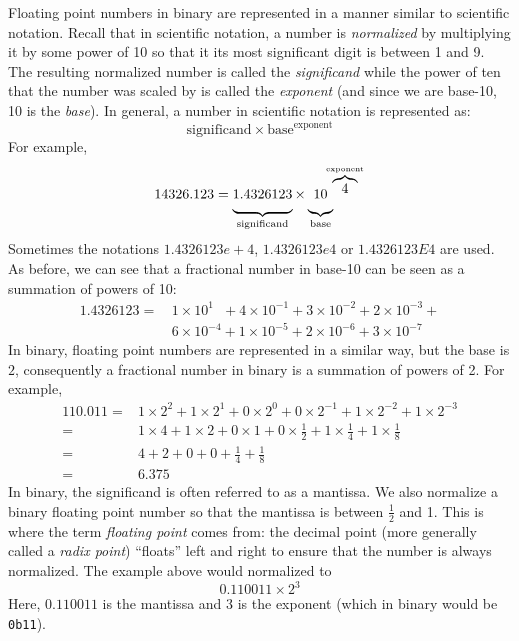Floating point  numbers in binary are 
represented in a manner similar
to scientific notation.  Recall that in scientific notation, a number is \emph{normalized}
by multiplying it by some power of 10 so that it its most significant digit is between 1
and 9.  The resulting normalized number is called the \emph{significand} while the
power of ten that the number was scaled by is called the \emph{exponent} (and
since we are base-10, 10 is the \emph{base}).  In general, a number in scientific
notation is represented as:
$$\text{significand} \times \text{base}^\text{exponent}$$
For example, 
$$14326.123 = \underbrace{ \vphantom{\frac{A}{B}} 1.4326123}_\text{significand} \times \underbrace{ \vphantom{\frac{A}{B}} 10}_\text{base}\!\!\!\!^{\overbrace{4}^\text{exponent}}$$
Sometimes the notations $1.4326123e+4$, $1.4326123e4$ or 
$1.4326123E4$ are used.  As before, we can see that a fractional number in base-10
can be seen as a summation of powers of 10:
\begin{align*}
  1.4326123 = \, & 1 \times 10^{1\,\,\,\,\,} + 4 \times 10^{-1} + 3 \times 10^{-2} + 2 \times 10^{-3} + \\
  	& 6 \times 10^{-4} + 1 \times 10^{-5} + 2 \times 10^{-6} + 3 \times 10^{-7} 
\end{align*}
In binary, floating point numbers are represented in a similar way, but the
base is $2$, consequently a fractional number in binary is a summation of
powers of 2.  For example, 
\begin{align*}
    110.011 = & 1 \times 2^2 + 1 \times 2^1 + 0 \times 2^0 + 0 \times 2^{-1} + 1 \times 2^{-2} + 1 \times 2^{-3} \\
            = & 1 \times 4 + 1 \times 2 + 0 \times 1 + 0 \times \frac{1}{2} + 1 \times \frac{1}{4} + 1 \times \frac{1}{8} \\
            = & 4 + 2 + 0 + 0 + \frac{1}{4} + \frac{1}{8} \\
            = & 6.375
\end{align*}
In binary, the significand is often referred to as a  
\gls{mantissa}.  We also 
normalize a binary floating point number so that the mantissa is 
between $\frac{1}{2}$ and 1.  
This is where the term \emph{floating point} comes from: the decimal point (more generally
called a \emph{radix point}) ``floats'' left and right to ensure that the number is always 
normalized.  The example above would normalized to 
  $$0.110011 \times 2^{3}$$
Here, $0.110011$ is the mantissa and $3$ is the exponent (which in binary would 
be \texttt{0b11}).

